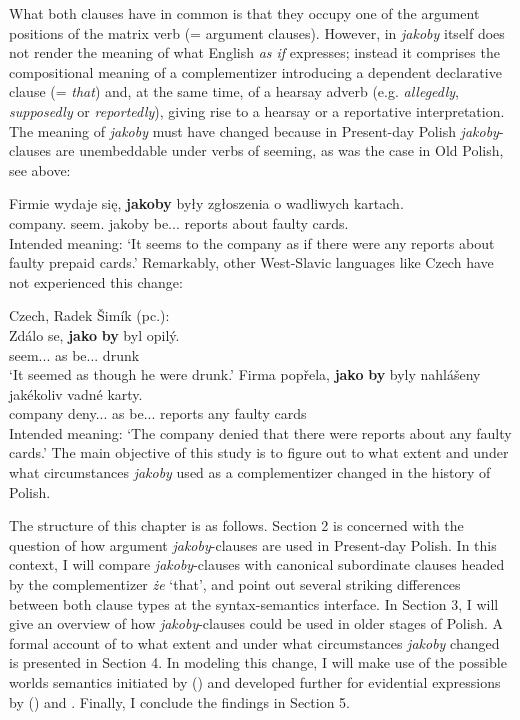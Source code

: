 \documentclass[output=paper
,modfonts
,nonflat]{langsci/langscibook}
\begin{document}
What both clauses have in common is that they occupy one of the argument positions of the matrix verb (= argument clauses). However, in  \emph{jakoby} itself does not render the meaning of what English \emph{as if} expresses; instead it comprises the compositional meaning of a complementizer introducing a dependent declarative clause (= \emph{that}) and, at the same time, of a hearsay adverb (e.g. \emph{allegedly}, \emph{supposedly} or \emph{reportedly}), giving rise to a hearsay or a reportative interpretation. The meaning of \emph{jakoby} must have changed because in Present-day Polish \emph{jakoby}-clauses are unembeddable under verbs of seeming, as was the case in Old Polish, see  above:


\ea \gll *Firmie wydaje się, \textbf{jakoby} były zgłoszenia o wadliwych kartach. \label{seem_jakoby} \\
		company.{\dat} seem.{\thirdperson}{\sg} {} jakoby be.{\lptcp}.{\nvir}.{\pl} reports about faulty cards.{\LOC}\\
\glt	Intended meaning: `It seems to the company as if there were any reports about faulty prepaid cards.'
\z
Remarkably, other West-Slavic languages like Czech have not experienced this change:

\ea Czech, Radek Šimík (pc.):\\
	\ea\gll	Zdálo se, \textbf{jako} \textbf{by} byl opilý. \\
		seem.{\lptcp}.{\sg}.{\n} {} as {\subj} be.{\lptcp}.{\sg}.{\masc} drunk \\
	\glt`It seemed as though he were drunk.'
	\ex\gll		*Firma popřela, \textbf{jako} \textbf{by} byly nahlášeny jakékoliv vadné karty. \label{nogo} \\
		company deny.{\lptcp}.{\sg}.{\fem} as {\subj} be.{\lptcp}.{\nvir}.{\pl} reports any faulty cards \\
	\glt Intended meaning: `The company denied that there were reports about any faulty cards.'
\z\z
The main objective of this study is to figure out to what extent and under what circumstances \emph{jakoby} used as a complementizer changed in the history of Polish.

The structure of this chapter is as follows. Section 2 is concerned with the question of how argument \emph{jakoby}-clauses are used in Present-day Polish. In this context, I will compare \emph{jakoby}-clauses with canonical subordinate clauses headed by the complementizer \emph{że} `that', and point out several striking differences between both clause types at the syntax-semantics interface. In Section 3, I will give an overview of how \emph{jakoby}-clauses could be used in older stages of Polish. A formal account of to what extent and under what circumstances \emph{jakoby} changed is presented in Section 4. In modeling this change, I will make use of the possible worlds semantics initiated by \citeauthor{Kratzer1981} (\citeyear{Kratzer1981, Kratzer1991, Kratzer2012}) and developed further for evidential expressions by \citeauthor{Faller2002} (\citeyear{Faller2002, Faller2011}) and \textcite{Lisa-Matthewson-Davis2017}.  Finally, I conclude the findings in Section 5.
\end{document}
